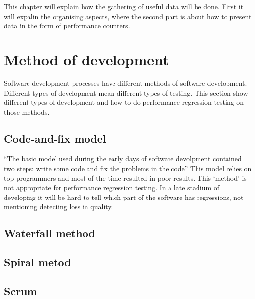 This chapter will explain how the gathering of useful data will be done. First it will expalin the organising aspects, where the second part is about how to present data in the form of performance counters.
\section{Method of development}
Software development processes have different methods of software development. Different types of development mean different types of testing. This section show different types of development and how to do performance regression testing on those methods.
\subsection{Code-and-fix model}
``The basic model used during the early days of software devolpment contained two steps: write some code and fix the problems in the code'' \cite{boehm1988spiral} This model relies on top programmers and most of the time resulted in poor results\cite{maccormack2003trade}. This `method' is not appropriate for performance regression testing. In a late stadium of developing it will be hard to tell which part of the software has regressions, not mentioning detecting loss in quality.

\subsection{Waterfall method}
\subsection{Spiral metod}
\subsection{Scrum}